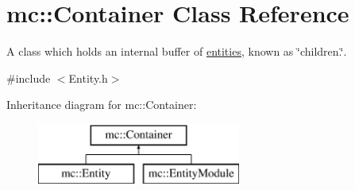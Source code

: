 \hypertarget{classmc_1_1_container}{}\section{mc\+:\+:Container Class Reference}
\label{classmc_1_1_container}


A class which holds an internal buffer of \hyperlink{classmc_1_1_entity}{entities,} known as \char`\"{}children.\char`\"{}.  




{\ttfamily \#include $<$Entity.\+h$>$}

Inheritance diagram for mc\+:\+:Container\+:\begin{figure}[H]
\begin{center}
\leavevmode
\includegraphics[height=2.000000cm]{d7/d2a/classmc_1_1_container}
\end{center}
\end{figure}

